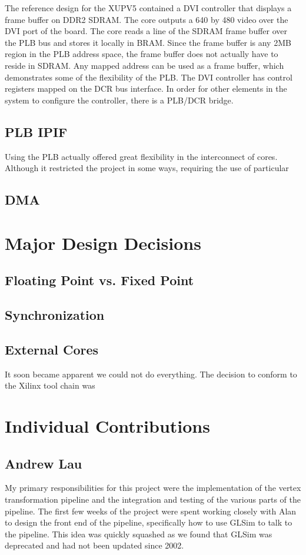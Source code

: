 \documentclass[letterpaper,10pt]{article}
\begin{document}
The reference design for the XUPV5 contained a DVI controller that displays a frame buffer on DDR2 SDRAM.  The core outputs a 640 by 480 video over the DVI port of the board.  The core reads a line of the SDRAM frame buffer over the PLB bus and stores it locally in BRAM. Since the frame buffer is any 2MB region in the PLB address space, the frame buffer does not actually have to reside in SDRAM.  Any mapped address can be used as a frame buffer, which demonstrates some of the flexibility of the PLB.  The DVI controller has control registers mapped on the DCR bus interface.  In order for other elements in the system to configure the controller, there is a PLB/DCR bridge.


\subsection{PLB IPIF}

Using the PLB actually offered great flexibility in the interconnect of cores.  Although it restricted the project in some ways, requiring the use of particular 

\subsection{DMA}


\section{Major Design Decisions}
\subsection{Floating Point vs. Fixed Point}
\subsection{Synchronization}
\subsection{External Cores}
It soon became apparent we could not do everything. The decision to conform to the Xilinx tool chain was 


\section{Individual Contributions}
\subsection{Andrew Lau}
My primary responsibilities for this project were the implementation of the vertex transformation pipeline and the integration and testing of the various parts of the pipeline. The first few weeks of the project were spent working closely with Alan to design the front end of the pipeline, specifically how to use GLSim to talk to the pipeline. This idea was quickly squashed as we found that GLSim was deprecated and had not been updated since 2002. \\
\end{document}
